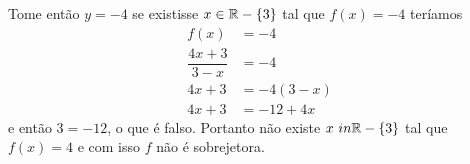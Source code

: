 \documentclass[12pt]{article}
\begin{document}
Tome então $y = -4$ se existisse $x \in \mathbb{R} - \{3\}$ tal que $f(x) = -4$ teríamos
\begin{align*}
	f(x) &= -4\\
	\dfrac{4x + 3}{3 - x} &= -4\\
	4x + 3 &= -4(3 - x)\\
	4x + 3 &= -12 + 4x
\end{align*}
e então $3 = -12$, o que é falso. Portanto não existe $x \ in \mathbb{R} - \{3\}$ tal que $f(x) = 4$ e com isso $f$ não é sobrejetora.
\end{document}
